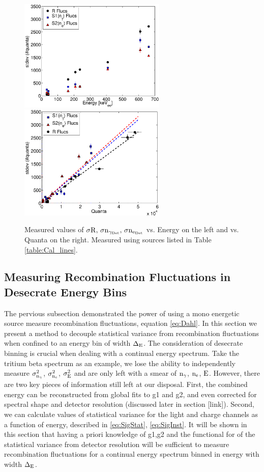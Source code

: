  \begin{figure}[h!]\centering
\includegraphics[width=70mm]{Recombination_LY_QY/Figures/fluc_E.eps}
\includegraphics[width=70mm]{Recombination_LY_QY/Figures/fluc_Q.eps}
\caption{Measured values of $\rm \sigma R, \, \sigma n_{\gamma_{Det}}, \,\sigma n_{e_{Det}} $ vs. Energy on the left and vs. Quanta on the right. Measured using sources listed in Table \ref{table:Cal_lines}. }
\label{fig:Flucs}
\end{figure}


\subsection{Measuring Recombination Fluctuations in Desecrate Energy Bins}
\label{sec:flucs_mono_bins}

The pervious subsection demonstrated the power of using a mono energetic source measure recombination fluctuations, equation  \ref{eq:Dahl}. In this section we present a method to decouple statistical variance from recombination fluctuations when confined to an energy bin of width $\rm \Delta_E$. The consideration of desecrate binning is crucial when dealing with a continual energy spectrum. Take the tritium beta spectrum as an example, we lose the ability to independently measure $\rm \sigma_{n_\gamma}^2$, $\rm \sigma_{n_e}^2$, $\rm \sigma_{E}^2 $ and are only left with a smear of $\rm n_\gamma$, $\rm n_e$, $\rm E $. However, there are two key pieces of information still left at our disposal. First, the combined energy can be reconstructed from global fits to g1 and g2, and even corrected for spectral shape and detector resolution (discussed later in section [link]). Second, we can calculate values of statistical variance for the light and charge channels as a function of energy, described in \ref{eq:SigStat},  \ref{eq:SigInst}. It will be shown in this section that having a priori knowledge of g1,g2 and the functional for of the statistical variance from detector resolution will be sufficient to measure recombination fluctuations for a continual energy spectrum binned in energy with width $\rm \Delta_E$.


